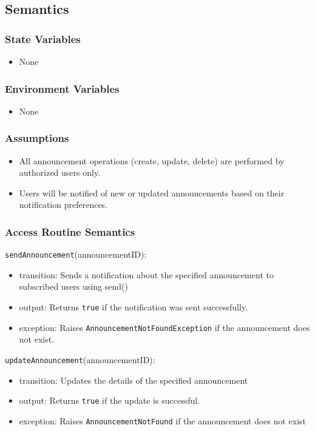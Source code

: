 \documentclass[12pt, titlepage]{article}
\begin{document}
\subsection{Semantics}

\subsubsection{State Variables}
\begin{itemize}
  \item None
\end{itemize}

\subsubsection{Environment Variables}
\begin{itemize}
  \item None
\end{itemize}

\subsubsection{Assumptions}
\begin{itemize}
  \item All announcement operations (create, update, delete) are performed by authorized users only.
  \item Users will be notified of new or updated announcements based on their notification preferences.
\end{itemize}

\subsubsection{Access Routine Semantics}

\noindent \texttt{sendAnnouncement}(announcementID):
\begin{itemize}
  \item transition: Sends a notification about the specified announcement to subscribed users using send()
  \item output: Returns \texttt{true} if the notification was sent successfully.
  \item exception: Raises \texttt{AnnouncementNotFoundException} if the announcement does not exist.
\end{itemize}

\noindent \texttt{updateAnnouncement}(announcementID):
\begin{itemize}
  \item transition: Updates the details of the specified announcement
  \item output: Returns \texttt{true} if the update is successful.
  \item exception: Raises \texttt{AnnouncementNotFound} if the announcement does not exist
\end{itemize}
\end{document}
